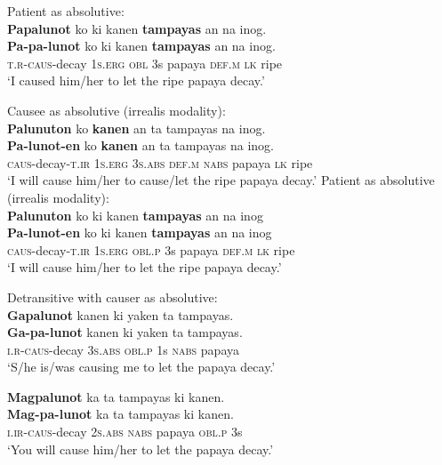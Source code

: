 \ea
Patient as absolutive: \\
\textbf{Papalunot}  ko  ki  kanen  \textbf{tampayas}  an  na  inog. \\\smallskip
\gll \textbf{Pa-pa-lunot}  ko  ki  kanen  \textbf{tampayas}  an  na  inog. \\
\textsc{t.r}-\textsc{caus}-decay  1\textsc{s.erg}  \textsc{obl}  3s  papaya  \textsc{def.m}  \textsc{lk}  ripe \\
\glt ‘I caused him/her to let the ripe papaya decay.’
\z

\ea
Causee as absolutive (irrealis modality): \\
\textbf{Palunuton}  ko  \textbf{kanen}  an  ta  tampayas  na  inog. \\\smallskip
\gll \textbf{Pa-lunot-en}  ko  \textbf{kanen}  an  ta  tampayas  na  inog. \\
\textsc{caus}-decay-\textsc{t.ir}  1\textsc{s.erg}  3\textsc{s.abs}  \textsc{def.m}  \textsc{nabs}  papaya \textsc{lk} ripe\\
\glt ‘I will cause him/her to cause/let the ripe papaya decay.’
\z
\ea
Patient as absolutive (irrealis modality): \\
\textbf{Palunuton}  ko  ki  kanen  \textbf{tampayas}  an  na  inog \\\smallskip
\gll \textbf{Pa-lunot-en}  ko  ki  kanen  \textbf{tampayas}  an  na  inog \\
\textsc{caus}-decay-\textsc{t.ir}  1\textsc{s.erg}  \textsc{obl.p}  3s  papaya  \textsc{def.m}  \textsc{lk}  ripe \\
\glt ‘I will cause him/her to let the ripe papaya decay.’
\z

\ea
Detransitive with causer as absolutive: \\
\textbf{Gapalunot}  kanen  ki  yaken  ta  tampayas. \\\smallskip
\gll \textbf{Ga-pa-lunot}  kanen  ki  yaken  ta  tampayas. \\
\textsc{i.r}-\textsc{caus}-decay  3\textsc{s.abs}  \textsc{obl.p}  1s  \textsc{nabs}  papaya \\
\glt ‘S/he is/was causing me to let the papaya decay.’
\z

\ea
\textbf{Magpalunot}  ka  ta  tampayas  ki  kanen. \\\smallskip
\gll \textbf{Mag-pa-lunot}  ka  ta  tampayas  ki  kanen. \\
\textsc{i.ir}-\textsc{caus}-decay  2\textsc{s.abs}  \textsc{nabs}  papaya  \textsc{obl.p}  3s \\
\glt ‘You will cause him/her to let the papaya decay.’
\z

